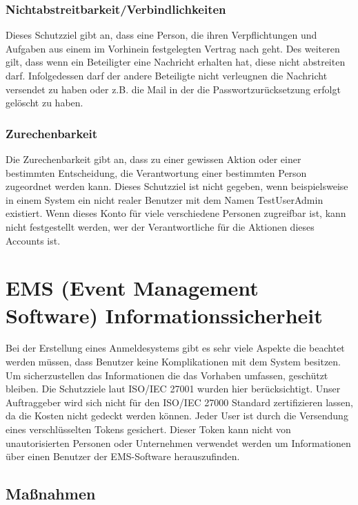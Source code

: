 \subsubsection{Nichtabstreitbarkeit/Verbindlichkeiten}
Dieses Schutzziel gibt an, dass eine Person, die ihren Verpflichtungen und Aufgaben aus einem im Vorhinein festgelegten Vertrag nach geht. Des weiteren gilt, dass wenn ein Beteiligter eine Nachricht erhalten hat, diese nicht abstreiten darf. Infolgedessen darf der andere Beteiligte nicht verleugnen die Nachricht versendet zu haben oder z.B. die Mail in der die Passwortzurücksetzung erfolgt gelöscht zu haben.

\subsubsection{Zurechenbarkeit}
Die Zurechenbarkeit gibt an, dass zu einer gewissen Aktion oder einer bestimmten Entscheidung, die Verantwortung einer bestimmten Person zugeordnet werden kann. Dieses Schutzziel ist nicht gegeben, wenn beispielsweise in einem System ein nicht realer Benutzer mit dem Namen TestUserAdmin existiert. Wenn dieses Konto für viele verschiedene Personen zugreifbar ist, kann nicht festgestellt werden, wer der Verantwortliche für die Aktionen dieses Accounts ist.

\section{EMS (Event Management Software) Informationssicherheit}
Bei der Erstellung eines Anmeldesystems gibt es sehr viele Aspekte die beachtet werden müssen, dass Benutzer keine Komplikationen mit dem System besitzen. Um sicherzustellen das Informationen die das Vorhaben umfassen, geschützt bleiben. Die Schutzziele laut ISO/IEC 27001 wurden hier berücksichtigt. Unser Auftraggeber wird sich nicht für den ISO/IEC 27000 Standard zertifizieren lassen, da die Kosten nicht gedeckt werden können.
Jeder User ist durch die Versendung eines verschlüsselten Tokens gesichert. Dieser Token kann nicht von unautorisierten Personen oder Unternehmen verwendet werden um Informationen über einen Benutzer der EMS-Software herauszufinden. 

\subsection{Maßnahmen}



\newpage